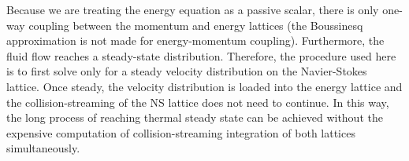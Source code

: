 Because we are treating the energy equation as a passive scalar, there is only one-way coupling between the momentum and energy lattices (the Boussinesq approximation is not made for energy-momentum coupling). Furthermore, the fluid flow reaches a steady-state distribution. Therefore, the procedure used here is to first solve only for a steady velocity distribution on the Navier-Stokes lattice. Once steady, the velocity distribution is loaded into the energy lattice and the collision-streaming of the NS lattice does not need to continue. In this way, the long process of reaching thermal steady state can be achieved without the expensive computation of collision-streaming integration of both lattices simultaneously.












